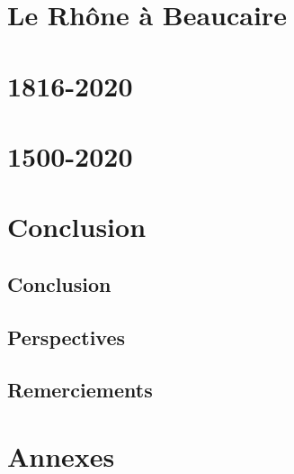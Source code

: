 \documentclass[compress,10pt]{beamer}
\renewcommand{\footfullcite}[1]{\footnote[frame]{\fullcite{#1}}}
\begin{document}
		
	  




\section{Le Rhône à Beaucaire}


\section{1816-2020}


\section{1500-2020}



\section{Conclusion}

	\subsection{Conclusion}
	\subsection{Perspectives}
	\subsection{Remerciements}
	
\printbibliography
	
\section{Annexes}
	



%		
%	
%
\begin{frame}
		\printbibliography
\end{frame}
\end{document}
